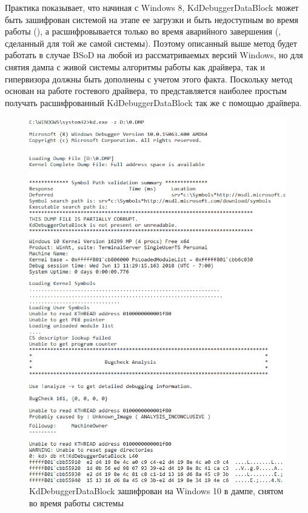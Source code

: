 \documentclass{mipt-thesis-bs}
\begin{document}
Практика показывает, что начиная с Windows 8, KdDebuggerDataBlock может быть зашифрован системой на этапе ее загрузки и быть недоступным во время работы (), а расшифровывается только во время аварийного завершения (, сделанный для той же самой системы). Поэтому описанный выше метод будет работать в случае BSoD на любой из рассматриваемых версий Windows, но для снятия дампа с живой системы алгоритмы работы как драйвера, так и гипервизора должны быть дополнены с учетом этого факта. Поскольку метод основан на работе гостевого драйвера, то представляется наиболее простым получать расшифрованный KdDebuggerDataBlock так же с помощью драйвера.

\begin{figure}[h]
\begin{center}
    \captionsetup{justification=centering}
    \includegraphics[width=1\textwidth]{kd2.png}
    \caption{KdDebuggerDataBlock зашифрован на Windows 10 в дампе, снятом во время работы системы}
    \label{fig:kd1}
\end{center}
\end{figure}
\end{document}

